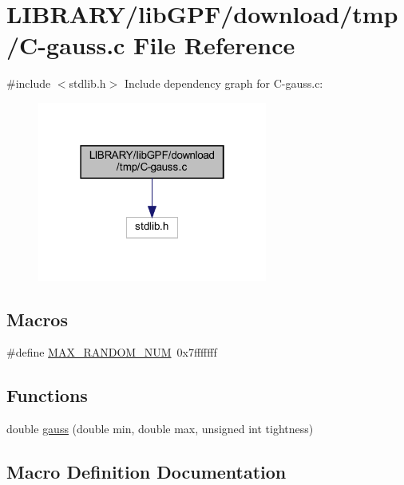 \hypertarget{C-gauss_8c}{}\section{L\+I\+B\+R\+A\+R\+Y/lib\+G\+P\+F/download/tmp/\+C-\/gauss.c File Reference}
\label{C-gauss_8c}
{\ttfamily \#include $<$stdlib.\+h$>$}\newline
Include dependency graph for C-\/gauss.c\+:
\nopagebreak
\begin{figure}[H]
\begin{center}
\leavevmode
\includegraphics[width=214pt]{C-gauss_8c__incl}
\end{center}
\end{figure}
\subsection*{Macros}
\begin{DoxyCompactItemize}
\item 
\#define \hyperlink{C-gauss_8c_a64407a0bc863a5b26b13d92cc62a70a2}{M\+A\+X\+\_\+\+R\+A\+N\+D\+O\+M\+\_\+\+N\+UM}~0x7fffffff
\end{DoxyCompactItemize}
\subsection*{Functions}
\begin{DoxyCompactItemize}
\item 
double \hyperlink{C-gauss_8c_accc1ca68e89030f8370eaa5093381e70}{gauss} (double min, double max, unsigned int tightness)
\end{DoxyCompactItemize}


\subsection{Macro Definition Documentation}
\mbox{\label{C-gauss_8c_a64407a0bc863a5b26b13d92cc62a70a2}} 
